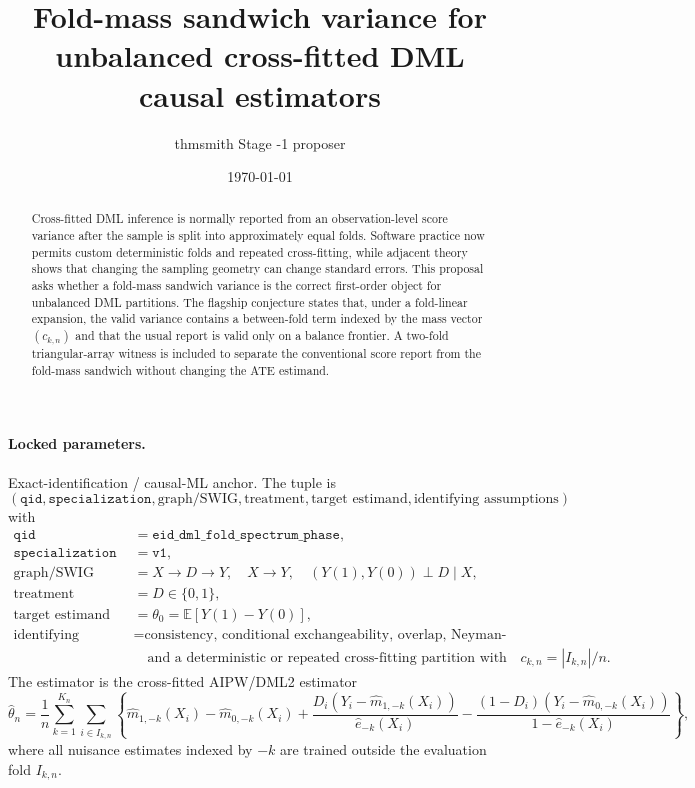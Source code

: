 \documentclass[11pt]{article}
\title{Fold-mass sandwich variance for unbalanced cross-fitted DML causal estimators}
\author{thmsmith Stage -1 proposer}
\date{\today}
\newcommand{\E}{\mathbb{E}}
\theoremstyle{definition}
\theoremstyle{plain}
\theoremstyle{remark}
\begin{document}
\maketitle


\paragraph{Locked parameters.}
Exact-identification / causal-ML anchor. The tuple is
\[
(\texttt{qid},\texttt{specialization},\text{graph/SWIG},\text{treatment},\text{target estimand},\text{identifying assumptions})
\]
with
\[
\begin{aligned}
\texttt{qid} &= \texttt{eid\_dml\_fold\_spectrum\_phase},\\
\texttt{specialization} &= \texttt{v1},\\
\text{graph/SWIG} &= X \to D \to Y,\quad X \to Y,\quad (Y(1),Y(0))\perp D\mid X,\\
\text{treatment} &= D\in\{0,1\},\\
\text{target estimand} &= \theta_0=\E[Y(1)-Y(0)],\\
\text{identifying assumptions} &= \text{consistency, conditional exchangeability, overlap, Neyman-orthogonal AIPW score,}\\
&\quad \text{and a deterministic or repeated cross-fitting partition with fold masses }c_{k,n}=|I_{k,n}|/n.
\end{aligned}
\]
The estimator is the cross-fitted AIPW/DML2 estimator
\[
\hat\theta_n=\frac1n\sum_{k=1}^{K_n}\sum_{i\in I_{k,n}}
\left\{\hat m_{1,-k}(X_i)-\hat m_{0,-k}(X_i)+
\frac{D_i(Y_i-\hat m_{1,-k}(X_i))}{\hat e_{-k}(X_i)}
-\frac{(1-D_i)(Y_i-\hat m_{0,-k}(X_i))}{1-\hat e_{-k}(X_i)}\right\},
\]
where all nuisance estimates indexed by \(-k\) are trained outside the evaluation fold \(I_{k,n}\).

\begin{abstract}
Cross-fitted DML inference is normally reported from an observation-level score variance after the sample is split into approximately equal folds. Software practice now permits custom deterministic folds and repeated cross-fitting, while adjacent theory shows that changing the sampling geometry can change standard errors. This proposal asks whether a fold-mass sandwich variance is the correct first-order object for unbalanced DML partitions. The flagship conjecture states that, under a fold-linear expansion, the valid variance contains a between-fold term indexed by the mass vector \((c_{k,n})\) and that the usual report is valid only on a balance frontier. A two-fold triangular-array witness is included to separate the conventional score report from the fold-mass sandwich without changing the ATE estimand.
\end{abstract}
\end{document}
